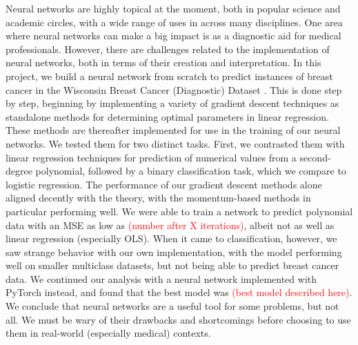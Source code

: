 \begin{adjustwidth}{2cm}{2cm} %
    Neural networks are highly topical at the moment, both in popular science and academic circles, with a wide range of uses in across many disciplines. One area where neural networks can make a big impact is as a diagnostic aid for medical professionals. However, there are challenges related to the implementation of neural networks, both in terms of their creation and interpretation. In this project, we build a neural network from scratch to predict instances of breast cancer in the Wisconsin Breast Cancer (Diagnostic) Dataset \cite{sklearnBreastCancerData}. This is done step by step, beginning by implementing a variety of gradient descent techniques as standalone methods for determining optimal parameters in linear regression. These methods are thereafter implemented for use in the training of our neural networks. We tested them for two distinct tasks. First, we contrasted them with linear regression techniques for prediction of numerical values from a second-degree polynomial, followed by a binary classification task, which we compare to logistic regression. The performance of our gradient descent methods alone aligned decently with the theory, with the momentum-based methods in particular performing well. We were able to train a network to predict polynomial data with an MSE as low as \textcolor{red}{(number after X iterations)}, albeit not as well as linear regression (especially OLS). When it came to classification, however, we saw strange behavior with our own implementation, with the model performing well on smaller multiclass datasets, but not being able to predict breast cancer data. We continued our analysis with a neural network implemented with PyTorch instead, and found that the best model was \textcolor{red}{(best model described here)}. We conclude that neural networks are a useful tool for some problems, but not all. We must be wary of their drawbacks and shortcomings before choosing to use them in real-world (especially medical) contexts.
      \end{adjustwidth}

